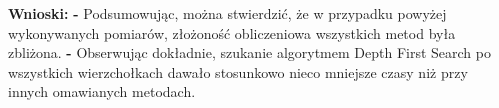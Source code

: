 \documentclass[12pt,a4paper,titlepage]{article}
\begin{document}
	
	
	
	
\textbf{Wnioski: \newline	\newline}
\textbf{-} Podsumowując, można stwierdzić, że w przypadku powyżej wykonywanych pomiarów, złożoność obliczeniowa wszystkich metod była zbliżona. \newline
\newline
 \textbf{-} Obserwując dokładnie, szukanie algorytmem Depth First Search po wszystkich wierzchołkach dawało stosunkowo nieco mniejsze czasy niż przy innych omawianych metodach. \newline
 
\end{document}

